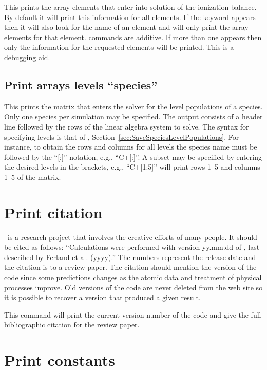 This prints the array elements that enter into solution
of the ionization balance.
By default it will print this information for
all elements.
If the keyword  appears then it will also look for the
name of an element and will only print the array
elements for that element.
 commands are additive.
If more than one appears then only the information for the
requested elements will be printed.
This is a debugging aid.

\subsection{Print arrays levels ``species''}
\label{sec:PrintArraysLevels}

\par
This prints the matrix that enters the solver
for the level populations of a species.
Only one species per simulation may be specified.
The output consists of a header line followed by the rows
of the linear algebra system to solve.
The syntax for specifying levels is that of
,
Section~\ref{sec:SaveSpeciesLevelPopulations}.
For instance, to obtain the rows and columns for all levels
the species name must be followed by the ``[:]'' notation,
e.g., ``C+[:]''.
A subset may be specified by entering the desired levels
in the brackets, e.g., ``C+[1:5]'' will print rows 1--5
and columns 1--5 of the matrix.


\section{Print citation}

\Cloudy\ is a research project that involves the creative efforts of many
people.  It should be cited as follows:  ``Calculations were performed with
version yy.mm.dd of \Cloudy, last described by Ferland et al. (yyyy).''
The numbers represent the release date and the citation is to a review paper.
The citation should mention the version of the code since some predictions
changes as the atomic data and treatment of physical processes improve.
Old versions of the code are never deleted from the web site so it is
possible to recover a version that produced a given result.

This command will print the current version number of the code and give
the full bibliographic citation for the review paper.

\section{Print constants}

